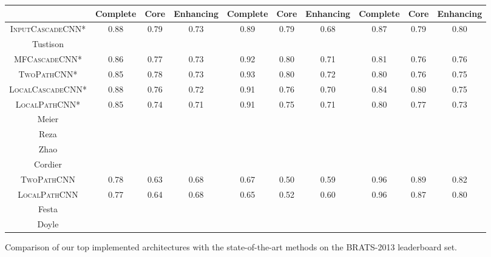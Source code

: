 \documentclass[final,5p,times,twocolumn]{elsarticle}
\begin{document}
{\begin{table*}[tp]
\begin{center}
{\begin{tabular}{*{10}{c}}
\cline{2-10}

  &Complete &Core &Enhancing &Complete &Core &Enhancing &Complete &Core &Enhancing\\ \hline

 \rowcolor[gray]{0.9}\textsc{InputCascadeCNN*}&  0.88  &0.79  &0.73  &0.89  &0.79  &0.68  &0.87  &0.79  &0.80      \\ 

Tustison	&	&	&	&	&	&	&	&	&	\\ 



 \rowcolor[gray]{0.9}\textsc{MFCascadeCNN*} &  0.86  &0.77  &0.73  &0.92  &0.80  &0.71  &0.81  &0.76  &0.76      \\ 

     



\rowcolor[gray]{0.9}\textsc{TwoPathCNN*} &0.85 & 0.78 & 0.73 &0.93  &0.80  &0.72  &0.80  &0.76  &0.75   \\ 

 \rowcolor[gray]{0.9}\textsc{LocalCascadeCNN*} &  0.88  &0.76  &0.72  &0.91  &0.76  &0.70  &0.84  &0.80  &0.75      \\ 

\rowcolor[gray]{0.9}\textsc{LocalPathCNN*}&  0.85  &0.74  &0.71  &0.91  &0.75  &0.71  &0.80  &0.77  &0.73   \\ Meier    	&	&	&	&	&	&	&	&	&\\ Reza  	&	&	&	&	&	&	&	&	&	\\ Zhao    	&	&	&	&	&	&	&	&	&\\ Cordier 	&	&	&	&	&	&	&	&	&\\ \rowcolor[gray]{0.9}\textsc{TwoPathCNN}&  0.78  &0.63  &0.68  &0.67  &0.50  &0.59  &0.96  &0.89  &0.82  \\ \rowcolor[gray]{0.9}\textsc{LocalPathCNN}&  0.77  &0.64  &0.68  &0.65  &0.52  &0.60  &0.96  &0.87  &0.80  \\ Festa 	&	&	&	&	&	&	&	&	&	\\ Doyle 	&	&	&	&	&	&	&	&	&	\\ \hline


\end{tabular}
}
\end{center}
\label{tab:brats-test}
\end{table*}

 \begin{table*}[]
\caption{ Comparison of our top implemented architectures with the state-of-the-art methods on the BRATS-2013 leaderboard set.}
\begin{center}


\end{center}
\end{table*}}
\end{document}
